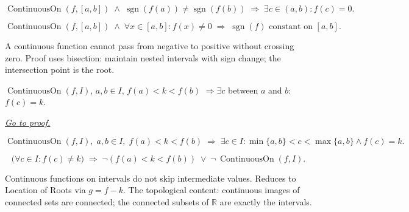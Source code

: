 \begin{remark*}
\[
  \operatorname{ContinuousOn}(f,[a,b])
  \;\wedge\;
  \operatorname{sgn}(f(a))\neq\operatorname{sgn}(f(b))
  \;\Rightarrow\;
  \exists c\in(a,b): f(c)=0.
\]
\end{remark*}

\begin{remark*}
\[
  \operatorname{ContinuousOn}(f,[a,b])
  \;\wedge\;
  \forall x\in[a,b]: f(x)\neq 0
  \;\Rightarrow\;
  \operatorname{sgn}(f)\text{ constant on }[a,b].
\]
\end{remark*}

\begin{remark*}[Interpretation]
A continuous function cannot pass from negative to positive without
crossing zero. Proof uses bisection: maintain nested intervals with
sign change; the intersection point is the root.
\end{remark*}


\begin{theorem}
\label{thm:bolzano-intermediate-value}
$\operatorname{ContinuousOn}(f,I)$, $a,b\in I$,
$f(a)<k<f(b)$ $\Rightarrow\exists c$ between $a$ and $b$: $f(c)=k$.

\smallskip\noindent
\hyperref[prf:bolzano-ivt]{\textit{Go to proof.}}
\end{theorem}

\begin{remark*}
\[
  \operatorname{ContinuousOn}(f,I),\;
  a,b\in I,\;
  f(a)<k<f(b)
  \;\Rightarrow\;
  \exists c\in I:\min\{a,b\}<c<\max\{a,b\}\wedge f(c)=k.
\]
\end{remark*}

\begin{remark*}
\[
  \bigl(\forall c\in I: f(c)\neq k\bigr)
  \;\Rightarrow\;
  \neg(f(a)<k<f(b))
  \;\vee\;
  \neg\,\operatorname{ContinuousOn}(f,I).
\]
\end{remark*}

\begin{remark*}[Interpretation]
Continuous functions on intervals do not skip intermediate values.
Reduces to Location of Roots via $g=f-k$. The topological content:
continuous images of connected sets are connected; the connected
subsets of $\mathbb{R}$ are exactly the intervals.
\end{remark*}

